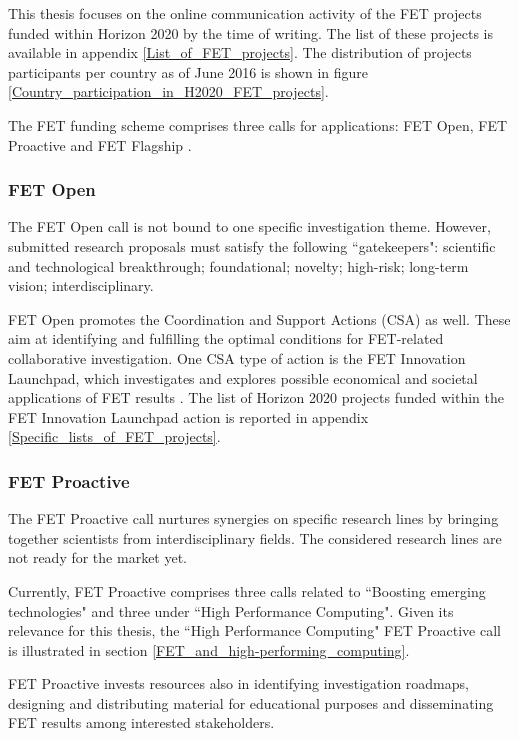 This thesis focuses on the online communication activity of the FET projects funded within Horizon 2020 by the time of writing. The list of these projects is available in appendix \ref{List_of_FET_projects}. The distribution of projects participants per country as of June 2016 is shown in figure \ref{Country_participation_in_H2020_FET_projects}.

The FET funding scheme comprises three calls for applications: FET Open, FET Proactive and FET Flagship \cite{FETOpen,FETProactive,FETFlagship}.

\subsubsection{FET Open}
The FET Open call is not bound to one specific investigation theme. However, submitted research proposals must satisfy the following ``gatekeepers": scientific and technological breakthrough; foundational; novelty; high-risk; long-term vision; interdisciplinary. 

FET Open promotes the Coordination and Support Actions (CSA) as well. These aim at identifying and fulfilling the optimal conditions for FET-related collaborative investigation. One CSA type of action is the FET Innovation Launchpad, which investigates and explores possible economical and societal applications of FET results \cite{FETLaunchpad}. The list of Horizon 2020 projects funded within the FET Innovation Launchpad action is reported in appendix \ref{Specific_lists_of_FET_projects}. 

\subsubsection{FET Proactive}
The FET Proactive call nurtures synergies on specific research lines by bringing together scientists from interdisciplinary fields. The considered research lines are not ready for the market yet.    

Currently, FET Proactive comprises three calls related to ``Boosting emerging technologies" and three under ``High Performance Computing". Given its relevance for this thesis, the ``High Performance Computing" FET Proactive call is illustrated in section \ref{FET_and_high-performing_computing}. 

FET Proactive invests resources also in identifying investigation roadmaps, designing and distributing material for educational purposes and disseminating FET results among interested stakeholders.  

